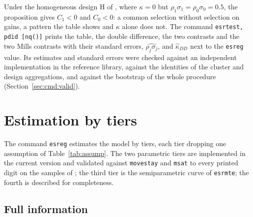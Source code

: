 \documentclass[11pt,a4paper]{article}
\theoremstyle{plain}
\theoremstyle{definition}
\theoremstyle{remark}
\newcommand{\1}{\mathbf{1}}
\newcommand{\cmd}[1]{\texttt{#1}}
\begin{document}
Under the homogeneous design H of \citet{araar2026sog}, where $\kappa=0$
but $\rho_1\sigma_1=\rho_0\sigma_0=0.5$, the proposition gives $C_1<0$ and
$C_0<0$: a common selection without selection on gains, a pattern the
table shows and $\kappa$ alone does not. The command \cmd{esrtest, pdid
[nq()]} prints the table, the double difference, the two contrasts and
the two Mills contrasts with their standard errors,
$\widehat{\rho_j\sigma_j}$, and $\hat\kappa_{DD}$ next to the \cmd{esreg}
value. Its estimates and standard errors were checked against an
independent implementation in the reference library, against the
identities of the cluster and design aggregations, and against the
bootstrap of the whole procedure (Section~\ref{sec:cmd:valid}).

\section{Estimation by tiers}\label{sec:est}

The command \cmd{esreg} estimates the model by tiers, each tier dropping
one assumption of Table~\ref{tab:assump}. The two parametric tiers are
implemented in the current version and validated against \cmd{movestay}
and \cmd{msat} to every printed digit on the samples of
\citet{araar2026msat}; the third tier is the semiparametric curve of
\cmd{esrmte}; the fourth is described for completeness.

\subsection{Full information}\label{sec:est:fiml}
\end{document}
